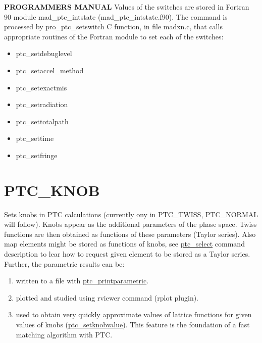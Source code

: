 {\bf PROGRAMMERS MANUAL}   
Values of the switches are stored in Fortran 90 module
mad\_ptc\_intstate (mad\_ptc\_intstate.f90). The command is processed by
pro\_ptc\_setswitch C function, in file madxn.c, that calls appropriate
routines of the Fortran module to set each of the switches:   
\begin{itemize}
   \item  ptc\_setdebuglevel 
   \item  ptc\_setaccel\_method 
   \item  ptc\_setexactmis 
   \item  ptc\_setradiation 
   \item  ptc\_settotalpath 
   \item  ptc\_settime 
   \item  ptc\_setfringe  
\end{itemize}



%

\section{PTC\_KNOB}
\label{sec:ptc_knob}


 Sets knobs in PTC calculations (currently ony in PTC\_TWISS,
 PTC\_NORMAL will follow). Knobs appear as the additional parameters of
 the phase space. Twiss functions are then obtained  as functions of
 these parameters (Taylor series).  Also map elements might be stored as
 functions of knobs, see  \href{PTC_Select.html}{ ptc\_select} command
 description to lear how to request given element to be stored as a
 Taylor series.  \\

Further, the parametric results can be: 
\begin{enumerate}
   \item  written to a file with
     \href{PTC_PrintParametric.html}{ptc\_printparametric}. 
   \item  plotted and studied using rviewer command (rplot plugin). 
   \item  used to obtain very quickly approximate values of lattice
     functions for given values of knobs
     (\href{PTC_SetKnobValue.html}{ptc\_setknobvalue}). This
     feature is the foundation of a fast matching algorithm with
     PTC.      
\end{enumerate}


